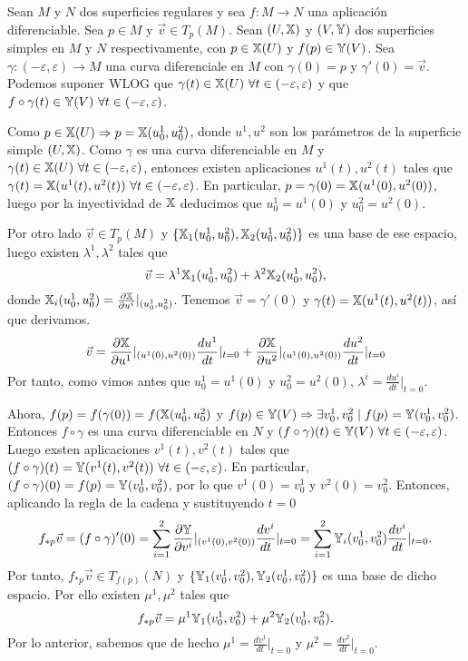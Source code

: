 \documentclass[GAP.tex]{subfiles}
\begin{document}
\begin{dem}[Teorema 17]
Sean $M$ y $N$ dos superficies regulares y sea $f:M\to N$ una aplicación diferenciable. Sea $p\in M$ y $\vec{v}\in T_p(M)$. Sean $(U,\mathbb{X})$ y $(V,\mathbb{Y})$ dos superficies simples en $M$ y $N$ respectivamente, con $p\in\mathbb{X}(U)$ y $f(p)\in\mathbb{Y}(V)$. Sea $\gamma:(-\varepsilon,\varepsilon)\to M$ una curva diferenciale en $M$ con $\gamma(0)=p$ y $\gamma'(0)=\vec{v}$. Podemos suponer WLOG que $\gamma(t)\in\X(U)\ \forall t\in(-\varepsilon,\varepsilon)$ y que $f\circ\gamma(t)\in\mathbb{Y}(V)\ \forall t\in(-\varepsilon,\varepsilon)$.  

Como $p\in\mathbb{X}(U)\Rightarrow p=\mathbb{X}(u_0^1,u_0^2)$, donde $u^1,u^2$ son los parámetros de la superficie simple $(U,\mathbb{X})$. Como $\gamma$ es una curva diferenciable en $M$ y $\gamma(t)\in\X(U)\ \forall t\in(-\varepsilon,\varepsilon)$, entonces existen aplicaciones $u^1(t),u^2(t)$ tales que $\gamma(t)=\X(u^1(t),u^2(t))\ \forall t\in(-\varepsilon,\varepsilon)$. En particular, $p=\gamma(0)=\mathbb{X}(u^1(0),u^2(0))$, luego por la inyectividad de $\mathbb{X}$ deducimos que $u^1_0=u^1(0)$ y $u^2_0=u^2(0)$.  

Por otro lado $\vec{v}\in T_p(M)$ y $\{\mathbb{X}_1(u^1_0,u^2_0),\mathbb{X}_2(u^1_0, u^2_0)\}$ es una base de ese espacio, luego existen $\lambda^1,\lambda^2$ tales que 
$$\vec{v}=\lambda^1\mathbb{X}_1(u^1_0,u^2_0)+\lambda^2\mathbb{X}_2(u^1_0,u^2_0),$$
donde $\mathbb{X}_i(u^1_0,u^2_0)=\frac{\partial\mathbb{X}}{\partial u^i}|_{(u^1_0,u^2_0)}$. Tenemos $\vec{v}=\gamma'(0)$ y $\gamma(t)=\mathbb{X}(u^1(t),u^2(t))$, así que derivamos.
$$\vec{v}=\frac{\partial\mathbb{X}}{\partial u^1}|_{(u^1(0),u^2(0))}\frac{du^1}{dt}|_{t=0}+\frac{\partial\mathbb{X}}{\partial u^2}|_{(u^1(0),u^2(0))}\frac{du^2}{dt}|_{t=0}$$
Por tanto, como vimos antes que $u^1_0=u^1(0)$ y $u^2_0=u^2(0)$, $\lambda^i= \frac{du^i}{dt}|_{t=0}$. 

Ahora, $f(p)=f(\gamma(0))=f(\mathbb{X}(u^1_0,u^2_0)$ y $f(p)\in\mathbb{Y}(V)\Rightarrow\exists v^1_0, v^2_0\mid f(p)=\mathbb{Y}(v^1_0,v^2_0)$. Entonces $f\circ\gamma$ es una curva diferenciable en $N$ y $(f\circ\gamma)(t)\in\mathbb{Y}(V)\ \forall t\in(-\varepsilon,\varepsilon)$. Luego exsten aplicaciones $v^1(t),v^2(t)$ tales que $(f\circ\gamma)(t)=\mathbb{Y}(v^1(t),v^2(t))\ \forall t\in(-\varepsilon,\varepsilon)$. En particular, $(f\circ\gamma)(0)=f(p)=\mathbb{Y}(v^1_0,v^2_0)$, por lo que $v^1(0)=v^1_0$ y $v^2(0)=v^2_0$. Entonces, aplicando la regla de la cadena y sustituyendo $t=0$
$$f_{*p}\vec{v}=(f\circ\gamma)'(0)=\sum_{i=1}^2\frac{\partial\mathbb{Y}}{\partial v^i}|_{(v^1(0),v^2(0))}\frac{dv^i}{dt}|_{t=0}=\sum_{i=1}^2\mathbb{Y}_i(v^1_0,v^2_0)\frac{dv^i}{dt}|_{t=0}.$$
Por tanto, $f_{*p}\vec{v}\in T_{f(p)}(N)$ y $\{\mathbb{Y}_1(v^1_0,v^2_0),\mathbb{Y}_2(v^1_0,v^2_0)\}$ es una base de dicho espacio. Por ello existen $\mu^1,\mu^2$ tales que $$f_{*p}\vec{v}=\mu^1\mathbb{Y}_1(v^1_0,v^2_0)+\mu^2\mathbb{Y}_2(v^1_0,v^2_0).$$
Por lo anterior, sabemos que de hecho $\mu^1=\frac{dv^1}{dt}|_{t=0}$ y $\mu^2=\frac{dv^2}{dt}|_{t=0}$.


\end{dem}
\end{document}
